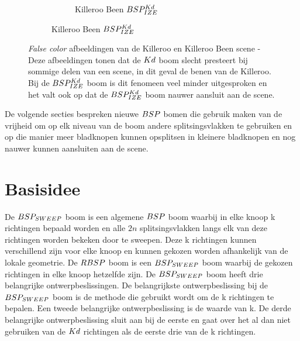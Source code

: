 \begin{figure}
\begin{subfigure}{0.5\textwidth}
\begin{subfigure}{\textwidth}
            \caption{Killeroo Been $BSP^{Kd}_{IZE}$}
            \label{fig:killeroo-been-bspize-heatmap}    
        \end{subfigure}
    \end{subfigure}
    \caption[\textit{False color} afbeeldingen van de Killeroo en Killeroo Been scene]{\textit{False color} afbeeldingen van de Killeroo en Killeroo Been scene - \small Deze afbeeldingen tonen dat de $Kd$ boom slecht presteert bij sommige delen van een scene, in dit geval de benen van de Killeroo. Bij de $BSP^{Kd}_{IZE}$ boom is dit fenomeen veel minder uitgesproken en het valt ook op dat de $BSP^{Kd}_{IZE}$ boom nauwer aansluit aan de scene.}
    \label{fig:killeroo-heatmaps}
\end{figure}

De volgende secties bespreken nieuwe $BSP$ bomen die gebruik maken van de vrijheid om op elk niveau van de boom andere splitsingsvlakken te gebruiken en op die manier meer bladknopen kunnen opsplitsen in kleinere bladknopen en nog nauwer kunnen aansluiten aan de scene.\\



\section{Basisidee}
    De $BSP_{SWEEP}$ boom is een algemene $BSP$ boom waarbij in elke knoop k richtingen bepaald worden en alle $2n$ splitsingsvlakken langs elk van deze richtingen worden bekeken door te sweepen.
    Deze k richtingen kunnen verschillend zijn voor elke knoop en kunnen gekozen worden afhankelijk van de lokale geometrie.
    De $RBSP$ boom is een $BSP_{SWEEP}$ boom waarbij de gekozen richtingen in elke knoop hetzelfde zijn.
    De $BSP_{SWEEP}$ boom heeft drie belangrijke ontwerpbeslissingen.
    De belangrijkste ontwerpbeslissing bij de $BSP_{SWEEP}$ boom is de methode die gebruikt wordt om de k richtingen te bepalen.
    Een tweede belangrijke ontwerpbeslissing is de waarde van k.
    De derde belangrijke ontwerpbeslissing sluit aan bij de eerste en gaat over het al dan niet gebruiken van de $Kd$ richtingen als de eerste drie van de k richtingen.
    \\


